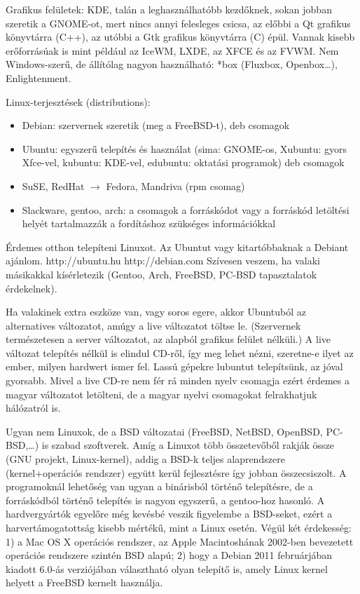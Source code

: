\documentclass[a4paper]{article}
\begin{document}
Grafikus felületek: KDE, talán a leghasználhatóbb kezdőknek, sokan
jobban szeretik a GNOME-ot, mert nincs annyi felesleges csicsa, az
előbbi a Qt grafikus könyvtárra (C++), az utóbbi a Gtk grafikus
könyvtárra (C) épül. Vannak kisebb erőforrásúak is mint például az
IceWM, LXDE, az XFCE és az FVWM. Nem Windows-szerű, de állítólag nagyon
használható: *box (Fluxbox, Openbox\dots), Enlightenment.

Linux-terjesztések (distributions):
\begin{itemize}
\item Debian: szervernek szeretik (meg a FreeBSD-t), deb csomagok
\item Ubuntu: egyszerű telepítés és használat (sima: GNOME-os, Xubuntu:
	gyors Xfce-vel, kubuntu: KDE-vel, edubuntu: oktatási programok)
	deb csomagok
\item SuSE, RedHat $\rightarrow$ Fedora, Mandriva (rpm csomag)
\item Slackware, gentoo, arch: a csomagok a forráskódot vagy a forráskód
        letöltési helyét tartalmazzák a fordításhoz szükséges információkkal
\end{itemize}

Érdemes otthon telepíteni Linuxot. Az Ubuntut vagy kitartóbbaknak a
Debiant ajánlom.  http://ubuntu.hu http://debian.com Szívesen veszem, ha
valaki másikakkal kísérletezik (Gentoo, Arch, FreeBSD, PC-BSD
tapasztalatok érdekelnek).

Ha valakinek extra eszköze van, vagy soros egere, akkor Ubuntuból az
alternatives változatot, amúgy a live változatot töltse le. (Szervernek
természetesen a server változatot, az alapból grafikus felület nélküli.)
A live változat telepítés nélkül is elindul CD-ről, így meg lehet nézni,
szeretne-e ilyet az ember, milyen hardwert ismer fel. Lassú gépekre
lubuntut telepítsünk, az jóval gyorsabb. Mivel a live CD-re nem fér rá
minden nyelv csomagja ezért érdemes a magyar változatot letölteni, de
a magyar nyelvi csomagokat felrakhatjuk hálózatról is.

Ugyan nem Linuxok, de a BSD változatai (FreeBSD, NetBSD, OpenBSD,
PC-BSD,\ldots) is szabad szoftverek. Amíg a Linuxot több összetevőből
rakják össze (GNU projekt, Linux-kernel), addig a BSD-k teljes alaprendszere
(kernel+operációs rendszer) együtt kerül fejlesztésre így jobban
összecsiszolt. A programoknál lehetőség van ugyan a binárisból történő
telepítésre, de a forráskódból történő telepítés is nagyon egyszerű, a
gentoo-hoz hasonló. A hardvergyártók egyelőre még kevésbé veszik
figyelembe a BSD-seket, ezért a harvertámogatottság kisebb mértékű, mint
a Linux esetén. Végül két érdekesség: 1) a Mac OS X operációs rendszer, az
Apple Macintoshának 2002-ben bevezetett operációs rendszere szintén
BSD alapú; 2) hogy a Debian 2011 februárjában kiadott 6.0-ás
verziójában választható olyan telepítő is, amely Linux kernel helyett a
FreeBSD kernelt használja.
\end{document}
